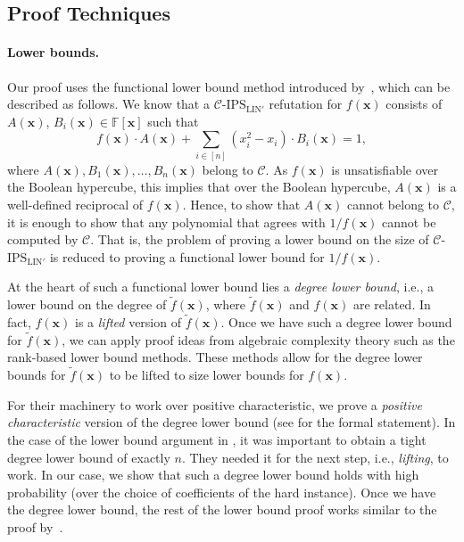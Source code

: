 \documentclass[11pt]{article}
\newcommand{\IPSLINp}{\mathrm{IPS}_{\mathrm{LIN}'}}
\newcommand{\xbar}{\mathbf{x}}
\begin{document}
\subsection{Proof Techniques}
\label{sec:techniques}
\paragraph{Lower bounds.}
Our proof uses the functional lower bound method introduced by~\cite{FSTW21}, which can be described as follows. We know that a $\mathcal{C}$-$\IPSLINp$ refutation for $f(\xbar)$ consists of $A(\xbar)$, $B_{i}(\xbar) \in \mathbb{F}[\xbar]$ such that \[f(\xbar) \cdot A(\xbar) + \sum_{i \in [n]} (x_i^2 - x_i) \cdot B_{i}(\xbar) = 1,\] where $A(\xbar), B_{1}(\xbar), \ldots, B_{n}(\xbar)$ belong to $\mathcal{C}$. As $f(\xbar)$ is unsatisfiable over the Boolean hypercube, this implies that over the Boolean hypercube, $A(\xbar)$ is a well-defined reciprocal of $f(\xbar)$. Hence, to show that $A(\xbar)$ cannot belong to $\mathcal{C}$, it is enough to show that any polynomial that agrees with $1/f(\xbar)$ cannot be computed by $\mathcal{C}$. That is, the problem of proving a lower bound on the size of $\mathcal{C}$-$\IPSLINp$ is reduced to proving a functional lower bound for $1/f(\xbar)$. 

At the heart of such a functional lower bound lies a \emph{degree lower bound}, i.e., a lower bound on the degree of $\tilde{f}(\xbar)$, where $\tilde{f}(\xbar)$ and $f(\xbar)$ are related. In fact, $f(\xbar)$ is a \emph{lifted} version of $\tilde{f}(\xbar)$. Once we have such a degree lower bound for $\tilde{f}(\xbar)$, we can apply proof ideas from algebraic complexity theory such as the rank-based lower bound methods. These methods allow for the degree lower bounds for $\tilde{f}(\xbar)$ to be lifted to size lower bounds for $f(\xbar)$.

For their machinery to work over positive characteristic, 
we prove a \emph{positive characteristic} version of the degree lower bound (see  for the formal statement). In the case of the lower bound argument in \cite{FSTW21}, it was important to obtain a tight degree lower bound of exactly $n$. They needed it for the next step, i.e., \emph{lifting}, to work. In our case, we show that such a degree lower bound holds with high probability (over the choice of coefficients of the hard instance). Once we have the degree lower bound, the rest of the lower bound proof works similar to the proof by~\cite{FSTW21}. 
\end{document}
